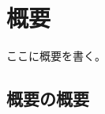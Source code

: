 \documentclass[./main]{subfiles}
\begin{document}
\chapter{概要}

ここに概要を書く。

\section{概要の概要}
\end{document}
